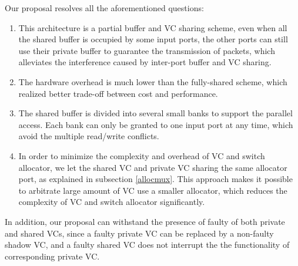 \documentclass[10pt,conference]{IEEEtran}
\begin{document}
Our proposal resolves all the aforementioned questions:
\begin{enumerate}
\item This architecture is a partial buffer and VC sharing scheme, even when all the shared buffer is occupied by some input ports, the other ports can still use their private buffer to guarantee the transmission of packets, which alleviates the interference caused by inter-port buffer and VC sharing.
\item The hardware overhead is much lower than the fully-shared scheme, which realized better trade-off between cost and performance.
\item The shared buffer is divided into several small banks to support the parallel access. Each bank can only be granted to one input port at any time, which avoid the multiple read/write conflicts.
\item In order to minimize the complexity and overhead of VC and switch allocator, we let the shared VC and private VC sharing the same allocator port, as explained in subsection \ref{allocmux}. This approach makes it possible to arbitrate large amount of VC use a smaller allocator, which reduces the complexity of VC and switch allocator significantly.
\end{enumerate}

In addition, our proposal can withstand the presence of faulty of both private and shared VCs, since a faulty private VC can be replaced by a non-faulty shadow VC, and a faulty shared VC does not interrupt the the functionality of corresponding private VC.

\end{document}
